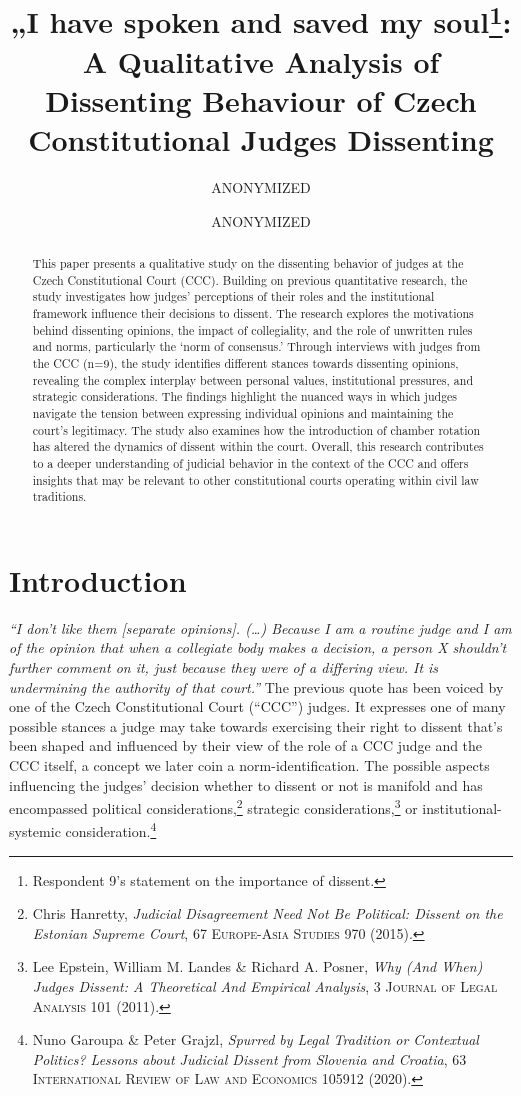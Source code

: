 \documentclass[
  11pt,
]{article}
\title{„I have spoken and saved my soul\footnote{Respondent 9's statement on the importance of dissent.}: A Qualitative Analysis of Dissenting Behaviour of Czech Constitutional Judges Dissenting}
\author{ANONYMIZED \and ANONYMIZED}
\date{}
\begin{document}
\maketitle
\begin{abstract}
This paper presents a qualitative study on the dissenting behavior of judges at the Czech Constitutional Court (CCC). Building on previous quantitative research, the study investigates how judges' perceptions of their roles and the institutional framework influence their decisions to dissent. The research explores the motivations behind dissenting opinions, the impact of collegiality, and the role of unwritten rules and norms, particularly the `norm of consensus.' Through interviews with judges from the CCC (n=9), the study identifies different stances towards dissenting opinions, revealing the complex interplay between personal values, institutional pressures, and strategic considerations. The findings highlight the nuanced ways in which judges navigate the tension between expressing individual opinions and maintaining the court's legitimacy. The study also examines how the introduction of chamber rotation has altered the dynamics of dissent within the court. Overall, this research contributes to a deeper understanding of judicial behavior in the context of the CCC and offers insights that may be relevant to other constitutional courts operating within civil law traditions.
\end{abstract}

\section{Introduction}\label{introduction}

\emph{``I don't like them {[}separate opinions{]}. (\ldots) Because I am a routine judge and I am of the opinion that when a collegiate body makes a decision, a person X shouldn't further comment on it, just because they were of a differing view. It is undermining the authority of that court.''} The previous quote has been voiced by one of the Czech Constitutional Court (``CCC'') judges. It expresses one of many possible stances a judge may take towards exercising their right to dissent that's been shaped and influenced by their view of the role of a CCC judge and the CCC itself, a concept we later coin a norm-identification. The possible aspects influencing the judges' decision whether to dissent or not is manifold and has encompassed political considerations,\footnote{Chris Hanretty, \emph{Judicial {Disagreement} Need Not Be {Political}: {Dissent} on the {Estonian Supreme Court}}, 67 \textsc{Europe-Asia Studies} 970 (2015).} strategic considerations,\footnote{Lee Epstein, William M. Landes \& Richard A. Posner, \emph{Why ({And When}) {Judges Dissent}: {A Theoretical And Empirical Analysis}}, 3 \textsc{Journal of Legal Analysis} 101 (2011).} or institutional-systemic consideration.\footnote{Nuno Garoupa \& Peter Grajzl, \emph{Spurred by Legal Tradition or Contextual Politics? {Lessons} about Judicial Dissent from {Slovenia} and {Croatia}}, 63 \textsc{International Review of Law and Economics} 105912 (2020).}
\end{document}
